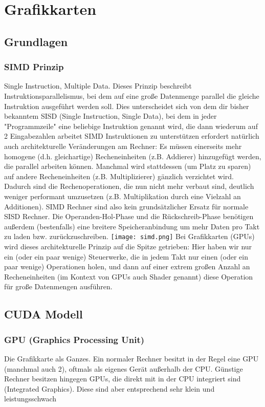 \section{Grafikkarten}
	\subsection{Grundlagen}
		\subsubsection{SIMD Prinzip}
			Single Instruction, Multiple Data. Dieses Prinzip beschreibt Instruktionsparallelismus, bei dem auf eine große Datenmenge parallel die gleiche Instruktion ausgeführt werden soll. Dies unterscheidet sich von dem dir bisher bekanntem SISD (Single Instruction, Single Data), bei dem in jeder "Programmzeile" eine beliebige Instruktion genannt wird, die dann wiederum auf 2 Eingabezahlen arbeitet \newline \newline
			SIMD Instruktionen zu unterstützen erfordert natürlich auch architekturelle Veränderungen am Rechner: Es müssen einerseits mehr homogene (d.h. gleichartige) Recheneinheiten (z.B. Addierer) hinzugefügt werden, die parallel arbeiten können. Manchmal wird stattdessen (um Platz zu sparen) auf andere Recheneinheiten (z.B. Multiplizierer) gänzlich verzichtet wird. Dadurch sind die Rechenoperationen, die nun nicht mehr verbaut sind, deutlich weniger performant umzusetzen (z.B. Multiplikation durch eine Vielzahl an Additionen). SIMD Rechner sind also kein grundsätzlicher Ersatz für normale SISD Rechner. \newline \newline
			Die Operanden-Hol-Phase und die Rückschreib-Phase benötigen außerdem (bestenfalls) eine breitere Speicheranbindung um mehr Daten pro Takt zu laden bzw. zurückzuschreiben. \newline
			\texttt{[image: simd.png]}
			Bei Grafikkarten (GPUs) wird dieses architekturelle Prinzip auf die Spitze getrieben: Hier haben wir nur ein (oder ein paar wenige) Steuerwerke, die in jedem Takt nur einen (oder ein paar wenige) Operationen holen, und dann auf einer extrem großen Anzahl an Recheneinheiten (im Kontext von GPUs auch Shader genannt) diese Operation für große Datenmengen ausführen.
	\subsection{CUDA Modell}
		\subsubsection{GPU (Graphics Processing Unit)}
			Die Grafikkarte als Ganzes. Ein normaler Rechner besitzt in der Regel eine GPU (manchmal auch 2), oftmals als eigenes Gerät außerhalb der CPU. Günstige Rechner besitzen hingegen GPUs, die direkt mit in der CPU integriert sind (Integrated Graphics). Diese sind aber entsprechend sehr klein und leistungsschwach
